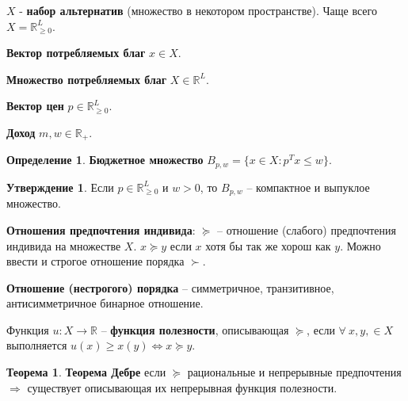 \documentclass[reqno]{article}
\theoremstyle{definition}
\theoremstyle{definition}
\theoremstyle{definition}
\theoremstyle{definition}
\theoremstyle{definition}
\theoremstyle{definition}
\newtheorem{thm}{Теорема}[section]
\theoremstyle{definition}
\newtheorem*{defi}{Определение}
\theoremstyle{definition}
\theoremstyle{definition}
\newtheorem{state}{Утверждение}[section]
\begin{document}
			$X$ - \textbf{набор альтернатив} (множество в некотором пространстве).
			Чаще всего $X = \mathds{R}^L_{\geq 0 }$.
			
			\textbf{Вектор потребляемых благ} $x \in X$.
			
			\textbf{Множество потребляемых благ} $X\in \mathds{R}^L$.
			
			\textbf{Вектор цен} $p \in \mathds{R}^L_{\geq0}$.
			
			\textbf{Доход} $m, w \in \mathds{R}_+$.
			
			\begin{defi}
				\textbf{Бюджетное множество} $B_{p, w} = \{x \in X : p^Tx \leq w\}$.
			\end{defi}
		
			\begin{state}
				Если $p \in \mathds{R}^L_{\geq 0}$ и $w > 0$, то $B_{p,w}$ -- компактное и выпуклое множество.
			\end{state}
		
			\textbf{Отношения предпочтения индивида}: $\succeq$ -- отношение (слабого) предпочтения индивида на множестве $X$. $x \succeq y$ если $x$ хотя бы так же хорош как $y$. Можно ввести и строгое отношение порядка $\succ$.
			
			\textbf{Отношение (нестрогого) порядка} -- симметричное, транзитивное, антисимметричное бинарное отношение.
			
			Функция $u : X \rightarrow \mathds{R}$ -- \textbf{функция полезности}, описывающая $\succeq$, если $\forall\ x, y, \in X$ выполняется $u(x) \geq x(y) \Leftrightarrow x \succeq y$.
			
			\begin{thm}
				\textbf{Теорема Дебре} если $\succeq$ рациональные и непрерывные предпочтения $\Rightarrow$ существует описывающая их непрерывная функция полезности.
			\end{thm}
						
		
\end{document}
